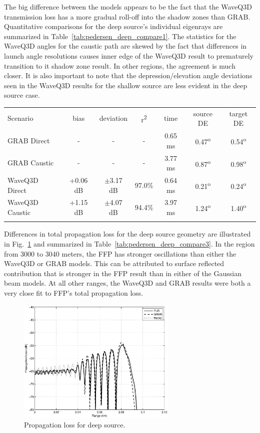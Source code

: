 \documentclass{ws-jca}
\begin{document}
The big difference between the models appears to be the fact that the
WaveQ3D transmission loss has a more gradual roll-off into the shadow zones
than GRAB. Quantitative comparisons for the deep source's individual
eigenrays are summarized in Table~\ref{tab:pedersen_deep_compare1}. The
statistics for the WaveQ3D angles for the caustic path are skewed by the
fact that differences in launch angle resolutions causes inner edge of the
WaveQ3D result to prematurely transition to it shadow zone result. In other
regions, the agreement is much closer. It is also important to note that
the depression/elevation angle deviations seen in the WaveQ3D results for
the shallow source are less evident in the deep source case.
\begin{table}[th]
	{\begin{tabular}{@{}lcccccc@{}} \toprule
		Scenario & bias & deviation & r\textsuperscript{2} 
			& time & source DE & target DE \\ \colrule
		GRAB Direct & - & - & - 
			& 0.65 ms & 0.47\textsuperscript{o} & 0.54\textsuperscript{o} \\
		GRAB Caustic & - & - & - 
			& 3.77 ms & 0.87\textsuperscript{o} & 0.98\textsuperscript{o} \\
		WaveQ3D Direct & +0.06 dB & \(\pm\)3.17 dB & 97.0\% 
			& 0.64 ms & 0.21\textsuperscript{o} & 0.24\textsuperscript{o} \\
		WaveQ3D Caustic & +1.15 dB & \(\pm\)4.07 dB & 94.4\% 
			& 3.97 ms & 1.24\textsuperscript{o} & 1.40\textsuperscript{o} \\
			\botrule
	\end{tabular}}
\end{table}

Differences in total propagation loss for the deep source geometry are
illustrated in Fig.~\ref{fig:pedersen_deep_compare3} and summarized in
Table~\ref{tab:pedersen_deep_compare3}. In the region from 3000 to 3040
meters, the FFP has stronger oscillations than either the WaveQ3D or GRAB
models. This can be attributed to surface reflected contribution that is
stronger in the FFP result than in either of the Gaussian beam models. At
all other ranges, the WaveQ3D and GRAB results were both a very close fit
to FFP's total propagation loss.
\begin{figure}[th]
	\centerline{\includegraphics[width=3in]{pedersen_deep_compare3.eps}} 
	\vspace*{8pt}
	\caption{Propagation loss for deep source. 
	\label{fig:pedersen_deep_compare3}}
\end{figure}
\end{document}
